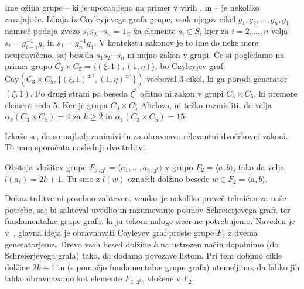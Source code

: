\begin{opomba} %
Ime ožina grupe -- ki je uporabljeno na primer v virih \cite{Schneider_2016}, \cite{Bradford_Thom_2017} in \cite{Schleimer_2001} -- je nekoliko zavajajoče. Izhaja iz Cayleyjevega grafa grupe, vsak njegov cikel $g_1 , g_2, \ldots, g_n, g_1$ namreč
podaja zvezo $s_1 s_2 \cdots s_n = 1_G$ za elemente $s_i \in S$, kjer za $i = 2, \ldots, n$ velja $s_i = g_{i - 1}^{-1} g_i$ in $s_1 = g_n^{-1} g_1$.
V kontekstu zakonov je to ime do neke mere neupravičeno, saj beseda $s_1 s_2 \cdots s_n$ ni nujno zakon v grupi. Če si pogledamo na primer grupo $C_3 \times C_5 = \langle (\xi, 1), (1, \eta) \rangle$,
bo Cayleyjev graf $\text{Cay}(C_3 \times C_5, \{ (\xi, 1)^{\pm 1} , (1, \eta)^{\pm 1} \})$ vseboval 3-cikel, ki ga porodi generator $(\xi , 1)$. Po drugi strani pa beseda $\xi^3$ očitno ni zakon v grupi $C_3 \times C_5$, ki premore element reda 5.
Ker je grupa $C_3 \times C_5$ Abelova, ni težko razmisliti, da velja $\alpha_k(C_3 \times C_5) = 4$ za $k \ge 2$ in $\alpha_1(C_3 \times C_5) = 15$. 

\end{opomba}

Izkaže se, da so najbolj zanimivi in za obravnavo relevantni dvočrkovni zakoni. To nam sporočata naslednji dve trditvi.
\begin{trditev}
\label{trd_vlozitev_proste_grupe}
 Obstaja vložitev grupe $F_{2 \cdot 3^{k}} = \langle a_1, \ldots, a_{2 \cdot 3^{k}} \rangle$ v grupo $F_2 = \langle a,b \rangle $, tako da velja $l(a_i) = 2k + 1$. Tu smo z $l(w)$ označili dolžino besede $w \in F_2 = \langle a,b \rangle$. 
\end{trditev}


\begin{dokaz}
Dokaz trditve ni posebno zahteven, vendar je nekoliko preveč tehničen za naše potrebe, saj bi zahteval uvedbo in razumevanje pojmov Schreierjevega grafa ter fundamentalne grupe grafa, ki ju tekom naloge sicer ne potrebujemo. Naveden je v~\cite[str.~5]{Schneider_2016}, glavna ideja je obravnavati Cayleyev graf proste grupe $F_2$ z dvema generatorjema.
Drevo vseh besed dolžine $k$ na ustrezen način dopolnimo (do Schreierjevega grafa) tako, da dodamo povezave listom. Pri tem dobimo cikle dolžine $2k + 1$ in (s pomočjo fundamentalne grupe grafa) utemeljimo, da lahko jih lahko obravnavamo kot elemente $F_{2 \cdot 3^{k}}$, vložene v $F_2$. 
\end{dokaz}



